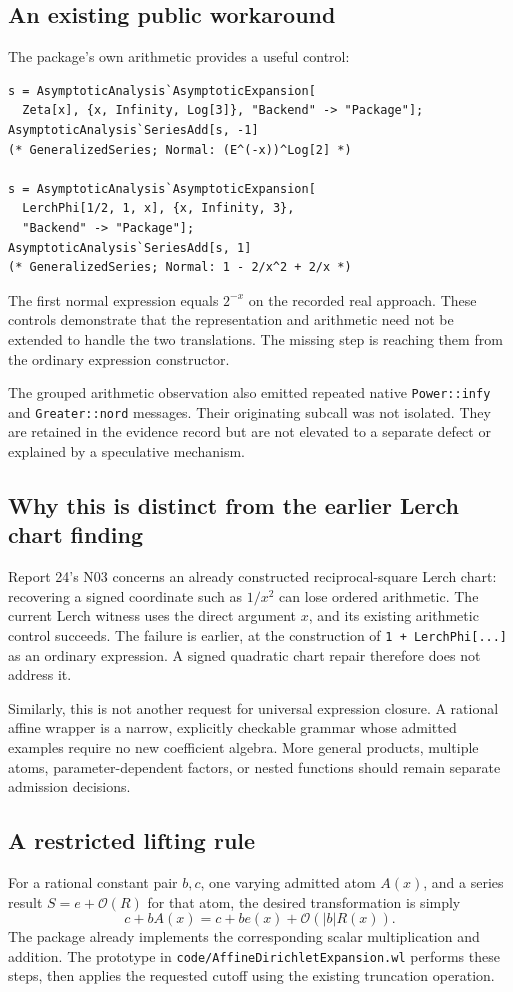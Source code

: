 \documentclass[11pt,letterpaper]{article}
\newcommand{\code}[1]{\nolinkurl{#1}}
\newcommand{\OO}{\mathcal O}
\begin{document}
\subsection{An existing public workaround}
The package's own arithmetic provides a useful control:
\begin{lstlisting}
s = AsymptoticAnalysis`AsymptoticExpansion[
  Zeta[x], {x, Infinity, Log[3]}, "Backend" -> "Package"];
AsymptoticAnalysis`SeriesAdd[s, -1]
(* GeneralizedSeries; Normal: (E^(-x))^Log[2] *)

s = AsymptoticAnalysis`AsymptoticExpansion[
  LerchPhi[1/2, 1, x], {x, Infinity, 3},
  "Backend" -> "Package"];
AsymptoticAnalysis`SeriesAdd[s, 1]
(* GeneralizedSeries; Normal: 1 - 2/x^2 + 2/x *)
\end{lstlisting}
The first normal expression equals $2^{-x}$ on the recorded real approach.
These controls demonstrate that the representation and arithmetic need not be
extended to handle the two translations. The missing step is reaching them
from the ordinary expression constructor.

The grouped arithmetic observation also emitted repeated native
\code{Power::infy} and \code{Greater::nord} messages. Their originating subcall
was not isolated. They are retained in the evidence record but are not elevated
to a separate defect or explained by a speculative mechanism.

\subsection{Why this is distinct from the earlier Lerch chart finding}
Report 24's N03 concerns an already constructed reciprocal-square Lerch chart:
recovering a signed coordinate such as $1/x^2$ can lose ordered arithmetic.
The current Lerch witness uses the direct argument $x$, and its existing
arithmetic control succeeds. The failure is earlier, at the construction of
\code{1 + LerchPhi[...]} as an ordinary expression. A signed quadratic chart
repair therefore does not address it.~\cite{report24}

Similarly, this is not another request for universal expression closure. A
rational affine wrapper is a narrow, explicitly checkable grammar whose
admitted examples require no new coefficient algebra. More general products,
multiple atoms, parameter-dependent factors, or nested functions should remain
separate admission decisions.

\subsection{A restricted lifting rule}
For a rational constant pair $b,c$, one varying admitted atom $A(x)$, and a
series result $S=e+\OO(R)$ for that atom, the desired transformation is simply
\begin{equation}
 c+bA(x)=c+be(x)+\OO(|b|R(x)).
\end{equation}
The package already implements the corresponding scalar multiplication and
addition. The prototype in \code{code/AffineDirichletExpansion.wl} performs
these steps, then applies the requested cutoff using the existing truncation
operation.
\end{document}
